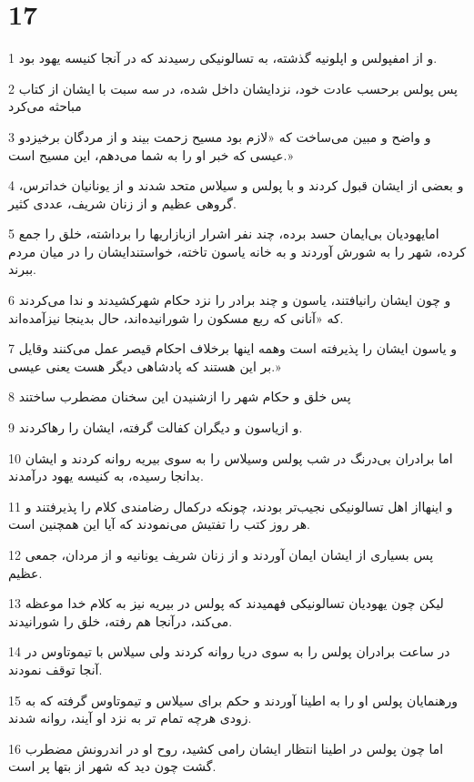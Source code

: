 \chapter{17}

\par 1 و از امفپولس و اپلونیه گذشته، به تسالونیکی رسیدند که در آنجا کنیسه یهود بود.
\par 2 پس پولس برحسب عادت خود، نزدایشان داخل شده، در سه سبت با ایشان از کتاب مباحثه می‌کرد
\par 3 و واضح و مبین می‌ساخت که «لازم بود مسیح زحمت بیند و از مردگان برخیزدو عیسی که خبر او را به شما می‌دهم، این مسیح است.»
\par 4 و بعضی از ایشان قبول کردند و با پولس و سیلاس متحد شدند و از یونانیان خداترس، گروهی عظیم و از زنان شریف، عددی کثیر.
\par 5 امایهودیان بی‌ایمان حسد برده، چند نفر اشرار ازبازاریها را برداشته، خلق را جمع کرده، شهر را به شورش آوردند و به خانه یاسون تاخته، خواستندایشان را در میان مردم ببرند.
\par 6 و چون ایشان رانیافتند، یاسون و چند برادر را نزد حکام شهرکشیدند و ندا می‌کردند که «آنانی که ربع مسکون را شورانیده‌اند، حال بدینجا نیزآمده‌اند.
\par 7 و یاسون ایشان را پذیرفته است وهمه اینها برخلاف احکام قیصر عمل می‌کنند وقایل بر این هستند که پادشاهی دیگر هست یعنی عیسی.»
\par 8 پس خلق و حکام شهر را ازشنیدن این سخنان مضطرب ساختند
\par 9 و ازیاسون و دیگران کفالت گرفته، ایشان را رهاکردند.
\par 10 اما برادران بی‌درنگ در شب پولس وسیلاس را به سوی بیریه روانه کردند و ایشان بدانجا رسیده، به کنیسه یهود درآمدند.
\par 11 و اینهااز اهل تسالونیکی نجیب‌تر بودند، چونکه درکمال رضامندی کلام را پذیرفتند و هر روز کتب را تفتیش می‌نمودند که آیا این همچنین است.
\par 12 پس بسیاری از ایشان ایمان آوردند و از زنان شریف یونانیه و از مردان، جمعی عظیم.
\par 13 لیکن چون یهودیان تسالونیکی فهمیدند که پولس در بیریه نیز به کلام خدا موعظه می‌کند، درآنجا هم رفته، خلق را شورانیدند.
\par 14 در ساعت برادران پولس را به سوی دریا روانه کردند ولی سیلاس با تیموتاوس در آنجا توقف نمودند.
\par 15 ورهنمایان پولس او را به اطینا آوردند و حکم برای سیلاس و تیموتاوس گرفته که به زودی هر‌چه تمام تر به نزد او آیند، روانه شدند.
\par 16 اما چون پولس در اطینا انتظار ایشان رامی کشید، روح او در اندرونش مضطرب گشت چون دید که شهر از بتها پر است.

